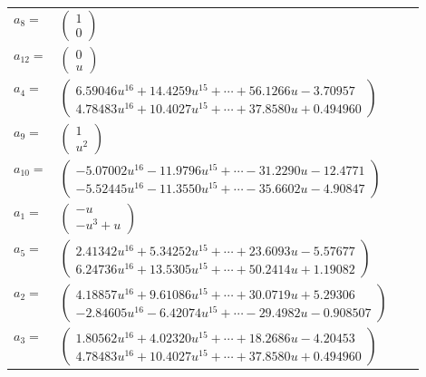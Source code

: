 \documentclass[1p]{elsarticle_modified}
\theoremstyle{definition}
\begin{document}
\begin{tabular}{m{7pt} m{180pt} m{7pt} m{180pt} }
\flushright $a_{8}=$&$\begin{pmatrix}1\\0\end{pmatrix}$ \\
\flushright $a_{12}=$&$\begin{pmatrix}0\\u\end{pmatrix}$ \\
\flushright $a_{4}=$&$\begin{pmatrix}6.59046 u^{16}+14.4259 u^{15}+\cdots+56.1266 u-3.70957\\4.78483 u^{16}+10.4027 u^{15}+\cdots+37.8580 u+0.494960\end{pmatrix}$ \\
\flushright $a_{9}=$&$\begin{pmatrix}1\\u^2\end{pmatrix}$ \\
\flushright $a_{10}=$&$\begin{pmatrix}-5.07002 u^{16}-11.9796 u^{15}+\cdots-31.2290 u-12.4771\\-5.52445 u^{16}-11.3550 u^{15}+\cdots-35.6602 u-4.90847\end{pmatrix}$ \\
\flushright $a_{1}=$&$\begin{pmatrix}- u\\- u^3+u\end{pmatrix}$ \\
\flushright $a_{5}=$&$\begin{pmatrix}2.41342 u^{16}+5.34252 u^{15}+\cdots+23.6093 u-5.57677\\6.24736 u^{16}+13.5305 u^{15}+\cdots+50.2414 u+1.19082\end{pmatrix}$ \\
\flushright $a_{2}=$&$\begin{pmatrix}4.18857 u^{16}+9.61086 u^{15}+\cdots+30.0719 u+5.29306\\-2.84605 u^{16}-6.42074 u^{15}+\cdots-29.4982 u-0.908507\end{pmatrix}$ \\
\flushright $a_{3}=$&$\begin{pmatrix}1.80562 u^{16}+4.02320 u^{15}+\cdots+18.2686 u-4.20453\\4.78483 u^{16}+10.4027 u^{15}+\cdots+37.8580 u+0.494960\end{pmatrix}$ \\

\end{tabular}
\end{document}
